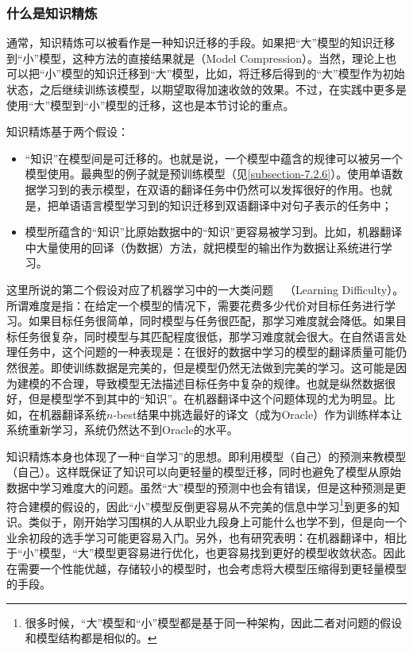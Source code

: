 \subsubsection{什么是知识精炼}

\parinterval 通常，知识精炼可以被看作是一种知识迁移的手段\cite{Hinton2015Distilling}。如果把``大''模型的知识迁移到``小''模型，这种方法的直接结果就是{\small{}}（Model Compression）。当然，理论上也可以把``小''模型的知识迁移到``大''模型，比如，将迁移后得到的``大''模型作为初始状态，之后继续训练该模型，以期望取得加速收敛的效果。不过，在实践中更多是使用``大''模型到``小''模型的迁移，这也是本节讨论的重点。

\parinterval 知识精炼基于两个假设：

\begin{itemize}
\vspace{0.5em}
\item ``知识''在模型间是可迁移的。也就是说，一个模型中蕴含的规律可以被另一个模型使用。最典型的例子就是预训练模型（见\ref{subsection-7.2.6}）。使用单语数据学习到的表示模型，在双语的翻译任务中仍然可以发挥很好的作用。也就是，把单语语言模型学习到的知识迁移到双语翻译中对句子表示的任务中；
\vspace{0.5em}
\item 模型所蕴含的``知识''比原始数据中的``知识''更容易被学习到。比如，机器翻译中大量使用的回译（伪数据）方法，就把模型的输出作为数据让系统进行学习。
\vspace{0.5em}
\end{itemize}

\parinterval 这里所说的第二个假设对应了机器学习中的一大类问题\ \dash \ {\small{}}（Learning Difficulty）。所谓难度是指：在给定一个模型的情况下，需要花费多少代价对目标任务进行学习。如果目标任务很简单，同时模型与任务很匹配，那学习难度就会降低。如果目标任务很复杂，同时模型与其匹配程度很低，那学习难度就会很大。在自然语言处理任务中，这个问题的一种表现是：在很好的数据中学习的模型的翻译质量可能仍然很差。即使训练数据是完美的，但是模型仍然无法做到完美的学习。这可能是因为建模的不合理，导致模型无法描述目标任务中复杂的规律。也就是纵然数据很好，但是模型学不到其中的``知识''。在机器翻译中这个问题体现的尤为明显。比如，在机器翻译系统$n$-best结果中挑选最好的译文（成为Oracle）作为训练样本让系统重新学习，系统仍然达不到Oracle的水平。

\parinterval 知识精炼本身也体现了一种``自学习''的思想。即利用模型（自己）的预测来教模型（自己）。这样既保证了知识可以向更轻量的模型迁移，同时也避免了模型从原始数据中学习难度大的问题。虽然``大''模型的预测中也会有错误，但是这种预测是更符合建模的假设的，因此``小''模型反倒更容易从不完美的信息中学习\footnote[15]{很多时候，``大''模型和``小''模型都是基于同一种架构，因此二者对问题的假设和模型结构都是相似的。}到更多的知识。类似于，刚开始学习围棋的人从职业九段身上可能什么也学不到，但是向一个业余初段的选手学习可能更容易入门。另外，也有研究表明：在机器翻译中，相比于``小''模型，``大''模型更容易进行优化，也更容易找到更好的模型收敛状态。因此在需要一个性能优越，存储较小的模型时，也会考虑将大模型压缩得到更轻量模型的手段\cite{DBLP:journals/corr/abs-2002-11794}。

